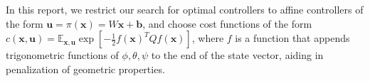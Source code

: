 \documentclass[main.tex]{subfiles}
\begin{document}
		In this report, we restrict our search for optimal controllers to affine controllers of the form
		$\bm{u} = \pi(\bm{x}) = W\bm{x} + \bm{b}$, and choose cost functions of the form
		$c(\bm{x}, \bm{u}) = \mathbb{E}_{\bm{x}, \bm{u}} \exp\left[-\frac{1}{2} f(\bm{x})^T Q f(\bm{x})\right]$, where $f$ is a function that appends trigonometric functions of $\phi, \theta, \psi$ to the end of the state vector, aiding in penalization of geometric properties.

\bib
\end{document}
